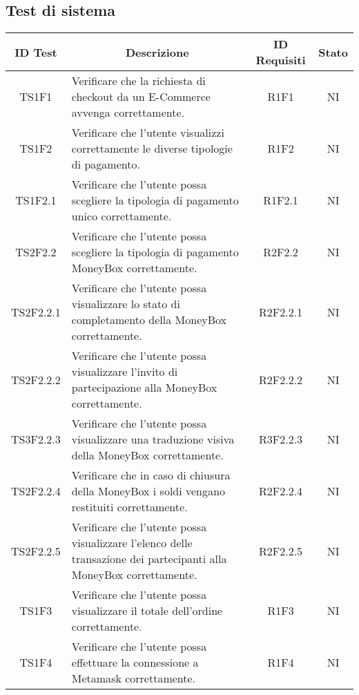\subsection{Test di sistema}\label{subsection:test_sistema}
\begin{table}[H]
  \centering
  \renewcommand{\arraystretch}{1.8}
  \begin{tabular}{c|p{8cm}|c|c}
    \rowcolor[HTML]{125E28}
    \color[HTML]{FFFFFF}\textbf{ID Test}
              & \multicolumn{1}{c}{\color[HTML]{FFFFFF}\textbf{Descrizione}}
              & \color[HTML]{FFFFFF}\textbf{ID Requisiti}
              & \color[HTML]{FFFFFF}\textbf{Stato}                                                                                                  \\
    \hline
    TS1F1     & Verificare che la richiesta di checkout da un E-Commerce\glo{} avvenga correttamente.                                     & R1F1     & NI \\
    TS1F2     & Verificare che l'utente visualizzi correttamente le diverse tipologie di pagamento.                                       & R1F2     & NI \\
    TS1F2.1   & Verificare che l'utente possa scegliere la tipologia di pagamento unico correttamente.                                    & R1F2.1   & NI \\
    TS2F2.2   & Verificare che l'utente possa scegliere la tipologia di pagamento MoneyBox\glo{} correttamente.                           & R2F2.2   & NI \\
    TS2F2.2.1 & Verificare che l'utente possa visualizzare lo stato di completamento della MoneyBox\glo{} correttamente.                  & R2F2.2.1 & NI \\
    TS2F2.2.2 & Verificare che l'utente possa visualizzare l'invito di partecipazione alla MoneyBox\glo{} correttamente.                  & R2F2.2.2 & NI \\
    TS3F2.2.3 & Verificare che l'utente possa visualizzare una traduzione visiva della MoneyBox\glo{} correttamente.                      & R3F2.2.3 & NI \\
    TS2F2.2.4 & Verificare che in caso di chiusura della MoneyBox\glo{} i soldi vengano restituiti correttamente.                         & R2F2.2.4 & NI \\
    TS2F2.2.5 & Verificare che l'utente possa visualizzare l'elenco delle transazione dei partecipanti alla MoneyBox\glo{} correttamente. & R2F2.2.5 & NI \\
    TS1F3     & Verificare che l'utente possa visualizzare il totale dell'ordine correttamente.                                           & R1F3     & NI \\
    TS1F4     & Verificare che l'utente possa effettuare la connessione a Metamask\glo{} correttamente.                                   & R1F4     & NI \\
  \end{tabular}
\end{table}
